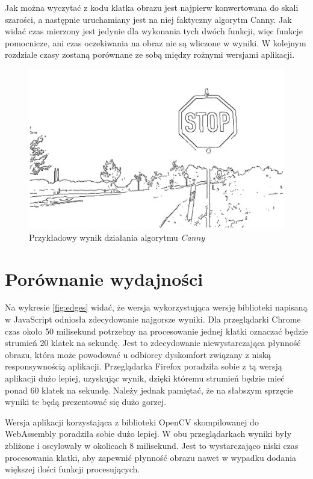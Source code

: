 \documentclass[language=polish,type=master]{aghmodern}
\begin{document}
Jak można wyczytać z kodu klatka obrazu jest najpierw konwertowana do skali szarości, a następnie uruchamiany jest na niej faktyczny algorytm Canny.
Jak widać czas mierzony jest jedynie dla wykonania tych dwóch funkcji, więc funkcje pomocnicze, ani czas oczekiwania na obraz nie są wliczone w wyniki.
W kolejnym rozdziale czasy zostaną porównane ze sobą między rożnymi wersjami aplikacji.

\begin{figure}[H]
    \centering
    \includegraphics[width=\textwidth]{images/edges.pdf}
    \vspace*{10pt}
    \caption{Przykładowy wynik działania algorytmu \emph{Canny}}
    \label{fig:edges_example}
\end{figure}

\section{Porównanie wydajności}
Na wykresie \ref{fig:edges} widać, że wersja wykorzystująca wersję biblioteki napisaną w JavaScript odniosła zdecydowanie najgorsze wyniki.
Dla przeglądarki Chrome czas około 50 milisekund potrzebny na procesowanie jednej klatki oznaczać będzie strumień 20 klatek na sekundę.
Jest to zdecydowanie niewystarczająca płynność obrazu, która może powodować u odbiorcy dyskomfort związany z niską responsywnością aplikacji.
Przeglądarka Firefox poradziła sobie z tą wersją aplikacji dużo lepiej, uzyskując wynik, dzięki któremu strumień będzie mieć ponad 60 klatek na sekundę.
Należy jednak pamiętać, że na słabszym sprzęcie wyniki te będą prezentować się dużo gorzej.

Wersja aplikacji korzystająca z biblioteki OpenCV skompilowanej do WebAssembly poradziła sobie dużo lepiej.
W obu przeglądarkach wyniki były zbliżone i oscylowały w okolicach 8 milisekund.
Jest to wystarczająco niski czas procesowania klatki, aby zapewnić płynność obrazu nawet w wypadku dodania większej ilości funkcji procesujących.
\end{document}
